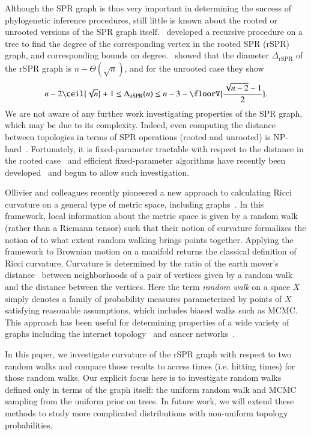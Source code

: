 \documentclass[]{elsarticle}
\begin{document}
Although the SPR graph is thus very important in determining the success of phylogenetic inference procedures, still little is known about the rooted or unrooted versions of the SPR graph itself.
\citep{Song2003-gf}~developed a recursive procedure on a tree to find the degree of the corresponding vertex in the rooted SPR (rSPR) graph, and corresponding bounds on degree.
\citep{Ding2011-bj}~showed that the diameter $\Delta_{\text{rSPR}}$ of the rSPR graph is $n - \Theta(\sqrt n)$, and for the unrooted case they show
\begin{equation}
n - 2\ceil{\sqrt{n}} + 1
\le \Delta_{\text{uSPR}}(n)
\le n - 3 - \floorV{\frac{\sqrt{n - 2} - 1}{2}}.
\end{equation}
We are not aware of any further work investigating properties of the SPR graph, which may be due to its complexity.
Indeed, even computing the distance between topologies in terms of SPR operations (rooted and unrooted) is NP-hard~\citep{bordewich05,hickey2008sdc}.
Fortunately, it is fixed-parameter tractable with respect to the distance in the rooted case~\citep{bordewich05} and efficient fixed-parameter algorithms have recently been developed~\citep{whidden2013hybridization,Whidden2015-yi} and begun to allow such investigation.

Ollivier and colleagues recently pioneered a new approach to calculating Ricci curvature on a general type of metric space, including graphs~\citep{Ollivier2009-bw,Joulin2010-jg}.
In this framework, local information about the metric space is given by a random walk (rather than a Riemann tensor) such that their notion of curvature formalizes the notion of to what extent random walking brings points together.
Applying the framework to Brownian motion on a manifold returns the classical definition of Ricci curvature.
Curvature is determined by the ratio of the earth mover's distance~\citep{rubner2000earth} between neighborhoods of a pair of vertices given by a random walk and the distance between the vertices.
Here the term \emph{random walk} on a space $X$ simply denotes a family of probability measures parameterized by points of $X$ satisfying reasonable assumptions, which includes biased walks such as MCMC.
This approach has been useful for determining properties of a wide variety of graphs including the internet topology~\citep{ni2015ricci} and cancer networks~\citep{sandhu2015graph}.

In this paper, we investigate curvature of the rSPR graph with respect to two random walks and compare those results to access times (i.e. hitting times) for those random walks.
Our explicit focus here is to investigate random walks defined only in terms of the graph itself: the uniform random walk and MCMC sampling from the uniform prior on trees.
In future work, we will extend these methods to study more complicated distributions with non-uniform topology probabilities.
\end{document}
